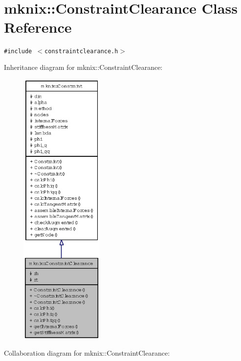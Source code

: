 \hypertarget{classmknix_1_1ConstraintClearance}{
\section{mknix::ConstraintClearance Class Reference}
\label{classmknix_1_1ConstraintClearance}
}
{\tt \#include $<$constraintclearance.h$>$}

Inheritance diagram for mknix::ConstraintClearance:\nopagebreak
\begin{figure}[H]
\begin{center}
\leavevmode
\includegraphics[height=400pt]{classmknix_1_1ConstraintClearance__inherit__graph}
\end{center}
\end{figure}
Collaboration diagram for mknix::ConstraintClearance:\nopagebreak
